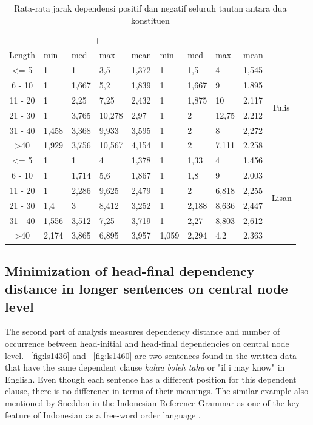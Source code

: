 \documentclass[10pt, a4paper, conference, compsocconf]{IEEEtran}
\begin{document}
\begin{table}
\begin{center}
\tiny
\caption{Rata-rata jarak dependensi positif dan negatif seluruh tautan antara dua konstituen}  \label{tab:deskriptif-mdd}
\begin{tabular}{c l l l l l l l l l}
\hline
 & \multicolumn{4}{c}{+} & \multicolumn{4}{c}{-} & \\  \cline{2-9}  
Length & min 	& med	& max 	& mean 	& min 	& med 	& max 	& mean 	& \\ \cline{1-10}  
\textless= 5 	& 1 		& 1 		& 3,5	 	& 1,372 	& 1 		& 1,5 	& 4	 	& 1,545 	&\multirow{6}{*}{Tulis}\\
6 - 10 		& 1 		& 1,667	& 5,2 	& 1,839 	& 1 		& 1,667 	& 9	 	& 1,895 	& 	\\
11 - 20 		& 1 		& 2,25 	& 7,25 	& 2,432 	& 1 		& 1,875 	& 10	 	& 2,117 	& 	\\
21 - 30 		& 1 		& 3,765 	& 10,278 	& 2,97 	& 1 		& 2 		& 12,75	& 2,212 	& 	\\ 
31 - 40 		& 1,458 	& 3,368 	& 9,933	& 3,595 	& 1 		& 2 		& 8		& 2,272 	& 	\\
\textgreater 40 	& 1,929 	& 3,756	& 10,567 	& 4,154 	& 1 		& 2 		& 7,111	& 2,258 	& 	\\ 
\hline
\textless= 5 	& 1 		& 1 		& 4	 	& 1,378 	& 1 		& 1,33 	& 4		& 1,456 	& \multirow{6}{*}{Lisan}\\
6 - 10 		& 1 		& 1,714	& 5,6 	& 1,867 	& 1 		& 1,8		& 9		& 2,003 	& \\
11 - 20 		& 1 		& 2,286 	& 9,625 	& 2,479 	& 1 		& 2 		& 6,818	& 2,255 	& \\
21 - 30 		& 1,4 	& 3	 	& 8,412 	& 3,252	& 1 		& 2,188	& 8,636	& 2,447 	& \\ 
31 - 40 		& 1,556 	& 3,512 	& 7,25	& 3,719 	& 1 		& 2,27	& 8,803	& 2,612 	& \\
\textgreater 40 	& 2,174 	& 3,865	& 6,895 	& 3,957 	& 1,059 	& 2,294	& 4,2		& 2,363 	& \\ 
\hline
   \end{tabular}
\end{center}
\end{table}

\subsection{Minimization of head-final dependency distance in longer sentences on central node level}
The second part of analysis measures dependency distance and number of occurrence between head-initial and head-final dependencies on central node level. \pic~\ref{fig:ls1436} and \pic~\ref{fig:ls1460} are two sentences found in the written data that have the same dependent clause \textit{kalau boleh tahu} or "if i may know" in English. Even though each sentence has a different position for this dependent clause, there is no difference in terms of their meanings. The similar example also mentioned by Sneddon in the Indonesian Reference Grammar as one of the key feature of Indonesian as a free-word order language \cite{sneddon2010indonesian}.
\end{document}
